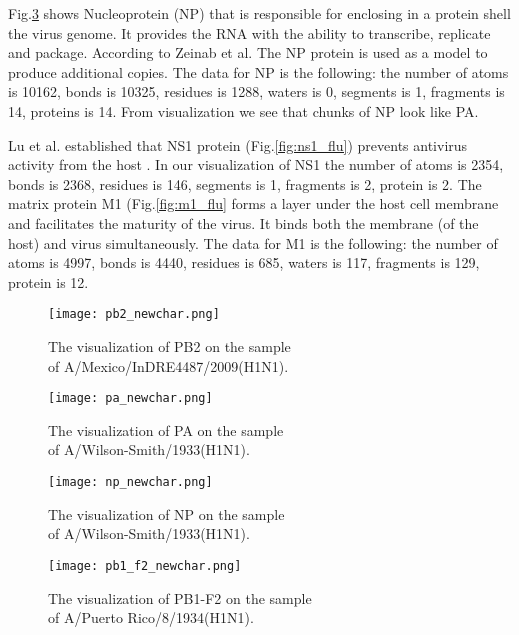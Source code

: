 \documentclass[conference]{IEEEtran}
\begin{document}
Fig.\ref{fig:np_flu} shows Nucleoprotein (NP) that is responsible for enclosing in a protein shell the virus genome. It provides the RNA with the ability to transcribe, replicate and package. According to Zeinab et al. The NP protein is used as a model to produce additional copies. The data for NP is the following: the number of atoms is 10162, bonds is 10325, residues is 1288, waters is 0, segments is 1, fragments is 14, proteins is 14. From visualization we see that chunks of NP look like PA. 

Lu et al. established that NS1 protein (Fig.\ref{fig:ns1_flu}) prevents antivirus activity from the host \citep{Lu}. In our visualization of NS1 the number of atoms is 2354, bonds is 2368, residues is 146, segments is 1, fragments is 2, protein is 2. 
The matrix protein M1 (Fig.\ref{fig:m1_flu} forms a layer under the host cell membrane and facilitates the maturity of the virus. It binds both the membrane (of the host) and virus simultaneously. The data for M1 is the following: the number of atoms is 4997, bonds is 4440, residues is 685, waters is 117, fragments is 129, protein is 12. 



\begin{figure}[htbp]
    \centerline{\texttt{[image: pb2\_newchar.png]}}
\caption{The visualization of PB2 on the sample \\ of A/Mexico/InDRE4487/2009(H1N1). }
\label{fig:pb2_flu}
\end{figure}


\begin{figure}[htbp]
    \centerline{\texttt{[image: pa\_newchar.png]}}
\caption{The visualization of PA on the sample \\ of A/Wilson-Smith/1933(H1N1). }
\label{fig:pa_flu}
\end{figure}

\begin{figure}[htbp]
    \centerline{\texttt{[image: np\_newchar.png]}}
\caption{The visualization of NP on the sample \\ of A/Wilson-Smith/1933(H1N1). }
\label{fig:np_flu}
\end{figure}

\begin{figure}[htbp]
    \centerline{\texttt{[image: pb1\_f2\_newchar.png]}}
\caption{The visualization of PB1-F2 on the sample\\ of A/Puerto Rico/8/1934(H1N1).  }
\label{fig:pb1_flu}
\end{figure}
\end{document}
